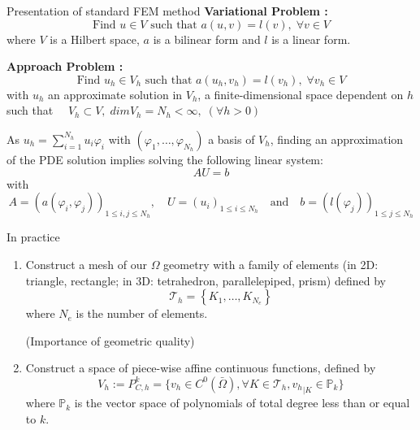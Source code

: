 \documentclass[compress,10pt,xcolor={table,dvipsnames},t]{beamer}
\begin{document}
	\begin{frame}{Presentation of standard FEM method}	
		\textbf{Variational Problem :} 
		\begin{equation*}
			\text{Find } u\in V \text{ such that } a(u,v)=l(v), \;\forall v\in V
		\end{equation*}
		where $V$ is a Hilbert space, $a$ is a bilinear form and $l$ is a linear form.
		
		\textbf{Approach Problem :} 
		\begin{equation*}
			\text{Find } u_h\in V_h \text{ such that } a(u_h,v_h)=l(v_h), \;\forall v_h\in V
		\end{equation*}
		with $u_h$ an approximate solution in $V_h$, a finite-dimensional space dependent on $h$ such that $\quad V_h\subset V, \; dimV_h = N_h<\infty, \; (\forall h>0)$ 
		
		As $u_h=\sum_{i=1}^{N_h}u_i\varphi_i$ with $(\varphi_1,\dots,\varphi_{N_h})$ a basis of $V_h$, finding an approximation of the PDE solution implies solving the following linear system:
		\begin{equation*}
			AU=b
		\end{equation*}
		with
		\begin{equation*}
			A=(a(\varphi_i,\varphi_j))_{1\le i,j\le N_h}, \quad U=(u_i)_{1\le i\le N_h} \quad \text{and} \quad b=(l(\varphi_j))_{1\le j\le N_h}
		\end{equation*}
	\end{frame}

	\begin{frame}{In practice}
		\begin{enumerate}[\ding{217}]
			\item \begin{minipage}[t]{0.68\linewidth}
				Construct a mesh of our $\Omega$ geometry with a family of elements (in 2D: triangle, rectangle; in 3D: tetrahedron, parallelepiped, prism) defined by
				$$\mathcal{T}_h = \left\{K_1,\dots,K_{N_e}\right\}$$
				where $N_e$ is the number of elements. \\
			\end{minipage} \begin{minipage}[t][][b]{0.28\linewidth}
				\centering
				\qquad {}
			\end{minipage}
			(Importance of geometric quality)
			\item Construct a space of piece-wise affine continuous functions, defined by
			\begin{equation*}
				V_h:=P_{C,h}^k=\{v_h\in C^0(\bar{\Omega}), \forall K\in\mathcal{T}_h, {v_h}_{|K}\in\mathbb{P}_k\}
			\end{equation*}
			where $\mathbb{P}_k$ is the vector space of polynomials of total degree less than or equal to $k$.
		\end{enumerate}
		
	\end{frame}
\end{document}
